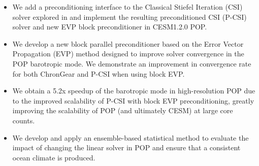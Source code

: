 \begin{eabstract}
\begin{itemize}
\item We add a preconditioning interface to the Classical Stiefel Iteration
(CSI) solver explored in \cite{hu2013scalable} and
implement the resulting preconditioned CSI (P-CSI) solver
and new EVP block preconditioner in CESM1.2.0 POP.
\item We develop a new block parallel preconditioner based on the
Error Vector Propagation (EVP) method \cite{roache1995elliptic} designed to
improve solver convergence in the POP barotropic mode. We demonstrate an improvement in convergence rate for both ChronGear and
P-CSI when using block EVP.
\item We obtain a 5.2x speedup of
  the barotropic mode in high-resolution POP due to the improved scalability
of P-CSI with block EVP preconditioning, greatly improving the
scalability of POP (and ultimately CESM) at large core counts.
\item We develop and apply an ensemble-based statistical method to evaluate the impact
of changing the linear solver in POP and ensure that a consistent ocean climate is produced.
\end{itemize}

\end{eabstract}

